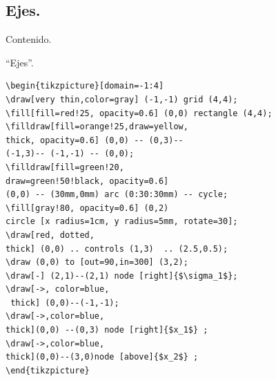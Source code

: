 \documentclass[dvipsnames,xcolor=x11names, handout]{beamer}
\theoremstyle{plain}
\theoremstyle{definition}
\begin{document}
\subsection{Ejes.}
\begin{frame}{Contenido.}
  \tableofcontents[currentsubsection]
\end{frame}
\begin{frame}[fragile]{``Ejes''.}
\begin{minipage}{0.45\linewidth}
\end{minipage}\pause
\begin{minipage}{0.5\linewidth}
\begin{tiny}
\begin{verbatim}
\begin{tikzpicture}[domain=-1:4] 
\draw[very thin,color=gray] (-1,-1) grid (4,4);
\fill[fill=red!25, opacity=0.6] (0,0) rectangle (4,4);
\filldraw[fill=orange!25,draw=yellow,
thick, opacity=0.6] (0,0) -- (0,3)--
(-1,3)-- (-1,-1) -- (0,0);
\filldraw[fill=green!20,
draw=green!50!black, opacity=0.6] 
(0,0) -- (30mm,0mm) arc (0:30:30mm) -- cycle;
\fill[gray!80, opacity=0.6] (0,2) 
circle [x radius=1cm, y radius=5mm, rotate=30];
\draw[red, dotted,
thick] (0,0) .. controls (1,3)  .. (2.5,0.5);
\draw (0,0) to [out=90,in=300] (3,2);
\draw[-] (2,1)--(2,1) node [right]{$\sigma_1$};
\draw[->, color=blue,
 thick] (0,0)--(-1,-1);
\draw[->,color=blue,
thick](0,0) --(0,3) node [right]{$x_1$} ;
\draw[->,color=blue,
thick](0,0)--(3,0)node [above]{$x_2$} ;
\end{tikzpicture}
\end{verbatim}
\end{tiny}
\end{minipage}
\end{frame}
\end{document}
